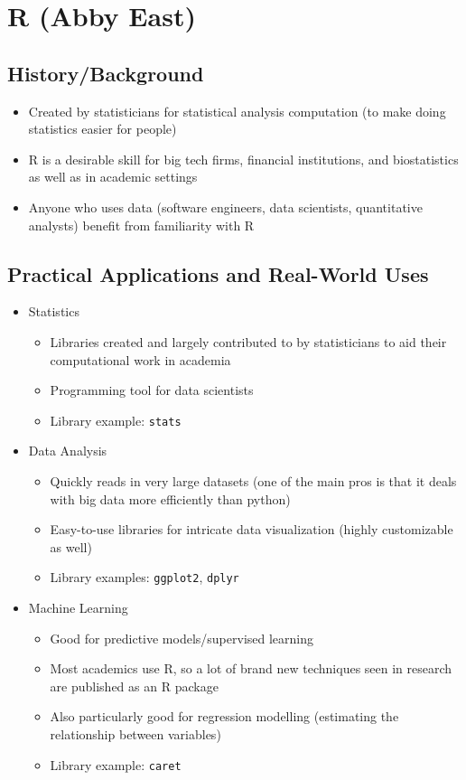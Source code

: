 \section{R (Abby East)}

\subsection{History/Background}
\begin{itemize}
	\item Created by statisticians for statistical analysis computation (to make doing statistics easier for people)
	\item R is a desirable skill for big tech firms, financial institutions, and biostatistics as well as in academic settings
	\item Anyone who uses data (software engineers, data scientists, quantitative analysts) benefit from familiarity with R
\end{itemize}

\subsection{Practical Applications and Real-World Uses}
\begin{itemize}
	\item Statistics
	\begin{itemize}
		\item Libraries created and largely contributed to by statisticians to aid their computational work in academia
		\item Programming tool for data scientists
		\item Library example: \texttt{stats}
	\end{itemize}

	\item Data Analysis
	\begin{itemize}
		\item Quickly reads in very large datasets (one of the main pros is that it deals with big data more efficiently than python)
		\item Easy-to-use libraries for intricate data visualization (highly customizable as well)
		\item Library examples: \texttt{ggplot2}, \texttt{dplyr}
	\end{itemize}

	\item Machine Learning
	\begin{itemize}
		\item Good for predictive models/supervised learning
		\item Most academics use R, so a lot of brand new techniques seen in research are published as an R package
		\item Also particularly good for regression modelling (estimating the relationship between variables)
		\item Library example: \texttt{caret}
	\end{itemize}
\end{itemize}

